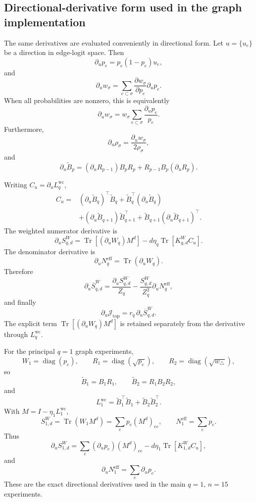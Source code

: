 \documentclass[pdflatex,sn-mathphys-num]{sn-jnl}%
\theoremstyle{thmstyleone}%
\theoremstyle{thmstyletwo}%
\theoremstyle{thmstylethree}%
\begin{document}
\begin{appendices}
\subsection{Directional-derivative form used in the graph implementation}

The same derivatives are evaluated conveniently in directional form. Let
\(u=\{u_e\}\) be a direction in edge-logit space. Then
\[
\partial_up_e
=
p_e(1-p_e)u_e,
\]
and
\[
\partial_uw_\sigma
=
\sum_{e\subset\sigma}
\frac{\partial w_\sigma}{\partial p_e}
\partial_up_e.
\]
When all probabilities are nonzero, this is equivalently
\[
\partial_uw_\sigma
=
w_\sigma
\sum_{e\subset\sigma}
\frac{\partial_up_e}{p_e}.
\]
Furthermore,
\[
\partial_u\rho_\sigma
=
\frac{\partial_uw_\sigma}{2\rho_\sigma},
\]
and
\[
\partial_u\widetilde B_p
=
(\partial_uR_{p-1})B_pR_p
+
R_{p-1}B_p(\partial_uR_p).
\]

Writing
\(C_u=\partial_uL_q^{\mathrm{wc}}\),
\[
\begin{aligned}
C_u
={}&
(\partial_u\widetilde B_q)^\top\widetilde B_q
+
\widetilde B_q^\top(\partial_u\widetilde B_q)\\
&+
(\partial_u\widetilde B_{q+1})
\widetilde B_{q+1}^\top
+
\widetilde B_{q+1}
(\partial_u\widetilde B_{q+1})^\top.
\end{aligned}
\]
The weighted numerator derivative is
\[
\partial_uS_{q,d}^{W}
=
\operatorname{Tr}
[(\partial_uW_q)M^d]
-
d\eta_q
\operatorname{Tr}
[K_{q,d}^{W}C_u].
\]
The denominator derivative is
\[
\partial_uN_q^{\mathrm{eff}}
=
\operatorname{Tr}(\partial_uW_q).
\]
Therefore
\[
\partial_u\overline S_{q,d}^{W}
=
\frac{
\partial_uS_{q,d}^{W}
}{Z_q}
-
\frac{
S_{q,d}^{W}
}{Z_q^2}
\partial_uN_q^{\mathrm{eff}},
\]
and finally
\[
\partial_u\mathcal J_{\mathrm{top}}
=
r_q\,
\partial_u\overline S_{q,d}^{W}.
\]
The explicit term
\(\operatorname{Tr}[(\partial_uW_q)M^d]\)
is retained separately from the derivative through \(L_q^{\mathrm{wc}}\).

For the principal \(q=1\) graph experiments,
\[
W_1=\operatorname{diag}(p_e),
\qquad
R_1=\operatorname{diag}(\sqrt{p_e}),
\qquad
R_2=\operatorname{diag}(\sqrt{w_\triangle}),
\]
so
\[
\widetilde B_1=B_1R_1,
\qquad
\widetilde B_2=R_1B_2R_2,
\]
and
\[
L_1^{\mathrm{wc}}
=
\widetilde B_1^\top\widetilde B_1
+
\widetilde B_2\widetilde B_2^\top.
\]
With \(M=I-\eta_1L_1^{\mathrm{wc}}\),
\[
S_{1,d}^{W}
=
\operatorname{Tr}(W_1M^d)
=
\sum_ep_e(M^d)_{ee},
\qquad
N_1^{\mathrm{eff}}
=
\sum_ep_e.
\]
Thus
\[
\partial_uS_{1,d}^{W}
=
\sum_e
(\partial_up_e)(M^d)_{ee}
-
d\eta_1
\operatorname{Tr}
[K_{1,d}^{W}C_u],
\]
and
\[
\partial_uN_1^{\mathrm{eff}}
=
\sum_e\partial_up_e.
\]
These are the exact directional derivatives used in the main \(q=1\), \(n=15\) experiments.


\end{appendices}
\end{document}
